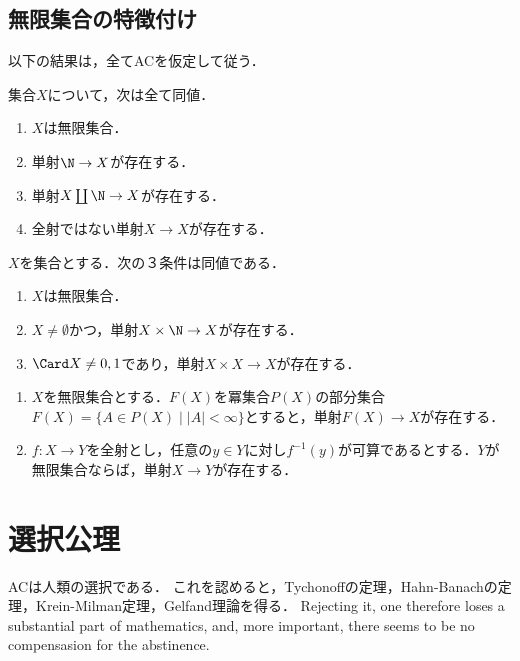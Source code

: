 \documentclass[uplatex,dvipdfmx]{jsreport}
\begin{document}
\subsection{無限集合の特徴付け}

以下の結果は，全てACを仮定して従う．

\begin{proposition}[無限集合の特徴付け１]
    集合$X$について，次は全て同値．
    \begin{enumerate}
        \item $X$は無限集合．
        \item 単射$\N\to X$が存在する．
        \item 単射$X\coprod\N\to X$が存在する．
        \item 全射ではない単射$X\to X$が存在する．
    \end{enumerate}
\end{proposition}

\begin{theorem}[無限集合の特徴付け２]
    $X$を集合とする．次の３条件は同値である．
    \begin{enumerate}
        \item $X$は無限集合．
        \item $X\ne\emptyset$かつ，単射$X\times\N\to X$が存在する．
        \item $\Card X\ne 0,1$であり，単射$X\times X\to X$が存在する．
    \end{enumerate}
\end{theorem}

\begin{corollary}\mbox{}
    \begin{enumerate}
        \item $X$を無限集合とする．$F(X)$を冪集合$P(X)$の部分集合$F(X)=\{A\in P(X)\mid |A|<\infty\}$とすると，単射$F(X)\to X$が存在する．
        \item $f:X\to Y$を全射とし，任意の$y\in Y$に対し$f^{-1}(y)$が可算であるとする．$Y$が無限集合ならば，単射$X\to Y$が存在する．
    \end{enumerate}
\end{corollary}

\section{選択公理}

\begin{tcolorbox}[colframe=ForestGreen, colback=ForestGreen!10!white,breakable,colbacktitle=ForestGreen!40!white,coltitle=black,fonttitle=\bfseries\sffamily,
title=]
    ACは人類の選択である．
    これを認めると，Tychonoffの定理，Hahn-Banachの定理，Krein-Milman定理，Gelfand理論を得る．
    Rejecting it, one therefore loses a substantial part of mathematics, and, more important, there seems to be no compensasion for the abstinence.\cite{Analysis Now}
\end{tcolorbox}
\end{document}
